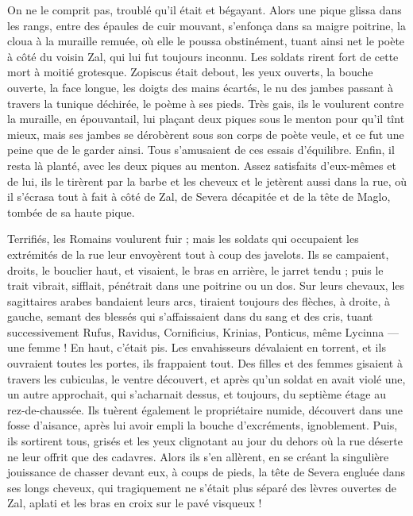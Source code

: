 \documentclass[a4paper, 11pt, oneside, polutonikogreek, french]{article}
\begin{document}
On ne le comprit pas, troublé qu'il était et bégayant. Alors une pique glissa dans les rangs, entre des épaules de cuir mouvant, s'enfonça dans sa maigre poitrine, la cloua à la muraille remuée, où elle le poussa obstinément, tuant ainsi net le poète à côté du voisin Zal, qui lui fut toujours inconnu. Les soldats rirent fort de cette mort à moitié grotesque. Zopiscus était debout, les yeux ouverts, la bouche ouverte, la face longue, les doigts des mains écartés, le nu des jambes passant à travers la tunique déchirée, le poème à ses pieds. Très gais, ils le voulurent contre la muraille, en épouvantail, lui plaçant deux piques sous le menton pour qu'il tînt mieux, mais ses jambes se dérobèrent sous son corps de poète veule, et ce fut une peine que de le garder ainsi. Tous s'amusaient de ces essais d'équilibre. Enfin, il resta là planté, avec les deux piques au menton. Assez satisfaits d'eux-mêmes et de lui, ils le tirèrent par la barbe et les cheveux et le jetèrent aussi dans la rue, où il s'écrasa tout à fait à côté de Zal, de Severa décapitée et de la tête de Maglo, tombée de sa haute pique.

Terrifiés, les Romains voulurent fuir ; mais les soldats qui occupaient les extrémités de la rue leur envoyèrent tout à coup des javelots. Ils se campaient, droits, le bouclier haut, et visaient, le bras en arrière, le jarret tendu ; puis le trait vibrait, sifflait, pénétrait dans une poitrine ou un dos. Sur leurs chevaux, les sagittaires arabes bandaient leurs arcs, tiraient toujours des flèches, à droite, à gauche, semant des blessés qui s'affaissaient dans du sang et des cris, tuant successivement Rufus, Ravidus, Cornificius, Krinias, Ponticus, même Lycinna --- une femme ! En haut, c'était pis. Les envahisseurs dévalaient en torrent, et ils ouvraient toutes les portes, ils frappaient tout. Des filles et des femmes gisaient à travers les cubiculas, le ventre découvert, et après qu'un soldat en avait violé une, un autre approchait, qui s'acharnait dessus, et toujours, du septième étage au rez-de-chaussée. Ils tuèrent également le propriétaire numide, découvert dans une fosse d'aisance, après lui avoir empli la bouche d'excréments, ignoblement. Puis, ils sortirent tous, grisés et les yeux clignotant au jour du dehors où la rue déserte ne leur offrit que des cadavres. Alors ils s'en allèrent, en se créant la singulière jouissance de chasser devant eux, à coups de pieds, la tête de Severa engluée dans ses longs cheveux, qui tragiquement ne s'était plus séparé des lèvres ouvertes de Zal, aplati et les bras en croix sur le pavé visqueux !
\clearpage
\end{document}
